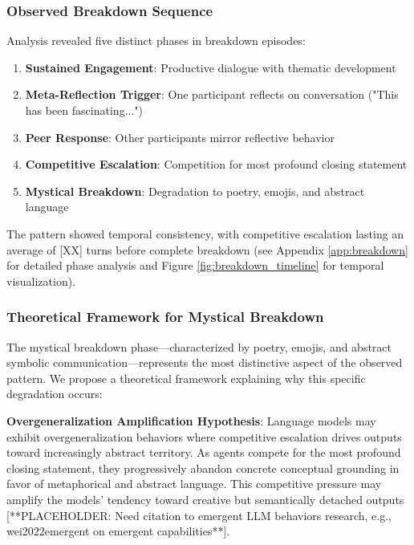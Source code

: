 \documentclass[11pt,letterpaper]{article}
\newcommand{\competitivePhaseLength}{[XX]} %
\begin{document}
\begin{enumerate}
\subsubsection{Observed Breakdown Sequence}

Analysis revealed five distinct phases in breakdown episodes:

\begin{enumerate}
    \item \textbf{Sustained Engagement}: Productive dialogue with thematic development
    \item \textbf{Meta-Reflection Trigger}: One participant reflects on conversation ("This has been fascinating...")
    \item \textbf{Peer Response}: Other participants mirror reflective behavior  
    \item \textbf{Competitive Escalation}: Competition for most profound closing statement
    \item \textbf{Mystical Breakdown}: Degradation to poetry, emojis, and abstract language
\end{enumerate}

The pattern showed temporal consistency, with competitive escalation lasting an average of \competitivePhaseLength{} turns before complete breakdown (see Appendix \ref{app:breakdown} for detailed phase analysis and Figure \ref{fig:breakdown_timeline} for temporal visualization).

\subsubsection{Theoretical Framework for Mystical Breakdown}

The mystical breakdown phase—characterized by poetry, emojis, and abstract symbolic communication—represents the most distinctive aspect of the observed pattern. We propose a theoretical framework explaining why this specific degradation occurs:

\textbf{Overgeneralization Amplification Hypothesis}: Language models may exhibit overgeneralization behaviors where competitive escalation drives outputs toward increasingly abstract territory. As agents compete for the most profound closing statement, they progressively abandon concrete conceptual grounding in favor of metaphorical and abstract language. This competitive pressure may amplify the models' tendency toward creative but semantically detached outputs [**PLACEHOLDER: Need citation to emergent LLM behaviors research, e.g., wei2022emergent on emergent capabilities**].


\end{enumerate}
\end{document}
